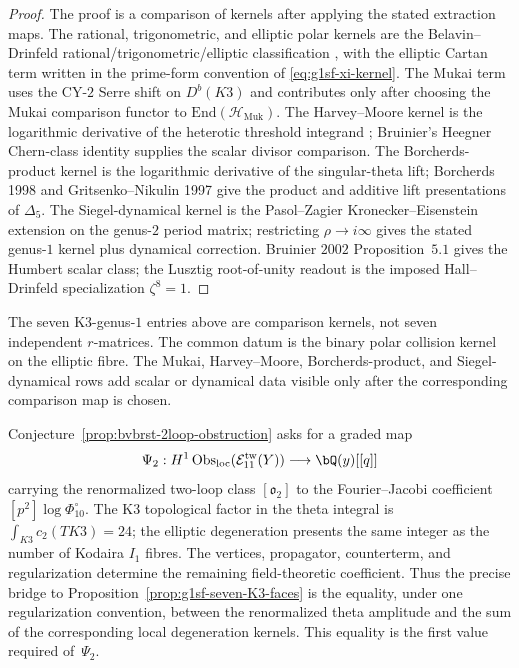 \begin{proof}
The proof is a comparison of kernels after applying the stated
extraction maps. The rational, trigonometric, and elliptic polar
kernels are the Belavin--Drinfeld rational/trigonometric/elliptic
classification \cite{Belavin81,BelavinDrinfeld82}, with the elliptic
Cartan term written in the prime-form convention of
\eqref{eq:g1sf-xi-kernel}. The Mukai term uses the CY-$2$ Serre shift
on $D^b(K3)$ and contributes only after choosing the Mukai comparison
functor to $\mathrm{End}(\mathcal{H}_{\mathrm{Muk}})$. The
Harvey--Moore kernel is the logarithmic derivative of the heterotic
threshold integrand \cite{HarveyMoore1996}; Bruinier's Heegner
Chern-class identity supplies the scalar divisor comparison. The
Borcherds-product kernel is the logarithmic derivative of the
singular-theta lift; Borcherds 1998 and Gritsenko--Nikulin 1997 give
the product and additive lift presentations of $\Delta_5$. The
Siegel-dynamical kernel is the Pasol--Zagier Kronecker--Eisenstein
extension on the genus-$2$ period matrix; restricting
$\rho\to i\infty$ gives the stated genus-$1$ kernel plus dynamical
correction. Bruinier $2002$ Proposition~$5.1$ gives the Humbert
scalar class; the Lusztig root-of-unity readout is the imposed
Hall--Drinfeld specialization $\zeta^8=1$.
\end{proof}

\begin{remark}
\label{rem:g1sf-faces-vs-specializations}
The seven K3-genus-$1$ entries above are comparison kernels, not seven
independent $r$-matrices. The common datum is the binary polar
collision kernel on the elliptic fibre. The Mukai, Harvey--Moore,
Borcherds-product, and Siegel-dynamical rows add scalar or dynamical
data visible only after the corresponding comparison map is chosen.
\end{remark}

\begin{remark}
\label{rem:g1sf-cross-ref}
\ClaimStatusHeuristic{}
Conjecture~\ref{prop:bvbrst-2loop-obstruction} asks for a graded map
\[
 \Psi _2:H^1\operatorname{Obs}_{\mathrm{loc}}
   (\mathcal E_{11}^{\mathrm{tw}}(Y))\longrightarrow \bQ(y)[[q]]
\]
carrying the renormalized two-loop class $[\mathfrak o_2]$ to the
Fourier--Jacobi coefficient $[p^2]\log\Phi_{10}^{\circ}$.  The K3
topological factor in the theta integral is
$\int_{K3}c_2(TK3)=24$; the elliptic degeneration presents the same
integer as the number of Kodaira $I_1$ fibres.  The vertices,
propagator, counterterm, and regularization determine the remaining
field-theoretic coefficient.  Thus the precise bridge to
Proposition~\ref{prop:g1sf-seven-K3-faces} is the equality, under one
regularization convention, between the renormalized theta amplitude
and the sum of the corresponding local degeneration kernels.  This
equality is the first value required of~$\Psi _2$.
\end{remark}
